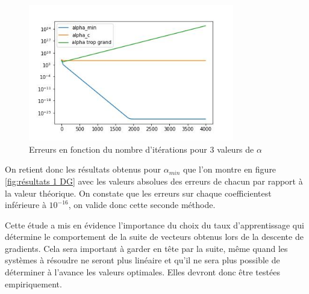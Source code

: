 \documentclass[12pt]{report}
\begin{document}
\begin{figure}
    \centering
    \includegraphics[width=0.8\textwidth]{comparaison_erreurs_selon_alpha_1D.jpg}
    \caption{Erreurs en fonction du nombre d'itérations pour 3 valeurs de $\alpha$}
    \label{fig:erreur selon alpha}
    \end{figure}


On retient donc les résultats obtenus pour $\alpha_{min}$ que l'on montre en figure \ref{fig:résultats 1 DG} avec les valeurs absolues des erreurs de chacun par rapport à la valeur théorique. 
On constate que les erreurs sur chaque coefficientest inférieure à $10^{-16}$, on valide donc cette seconde méthode.

Cette étude a mis en évidence l'importance du choix du taux d'apprentissage qui détermine le comportement de la suite de vecteurs obtenus lors de la descente de gradients. 
Cela sera important à garder en tête par la suite, même quand les systèmes à résoudre ne seront plus linéaire et qu'il ne sera plus possible de déterminer à l'avance les valeurs optimales. 
Elles devront donc être testées empiriquement.
\end{document}
